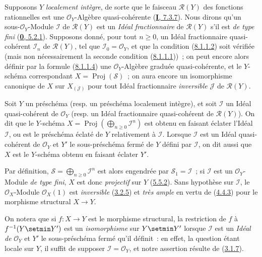 \begin{env}[8.1.2]
\label{II.8.1.2-fr}
Supposons $Y$ \emph{localement intègre}, de sorte que le faisceau
$\mathcal{R}(Y)$ des fonctions rationnelles est une $\mathcal{O}_Y$-Algèbre
quasi-cohérente (\hyperref[I.7.3.7-fr]{\textbf{I}, 7.3.7}). Nous dirons qu'un
sous-$\mathcal{O}_Y$-Module $\mathcal{I}$ de $\mathcal{R}(Y)$ est un
\emph{Idéal fractionnaire} de $\mathcal{R}(Y)$ s'il est \emph{de type fini}
(\hyperref[0.5.2.1-fr]{\textbf{0}, 5.2.1}). Supposons donné, pour tout $n\geq0$, un
Idéal fractionnaire quasi-cohérent $\mathcal{I}_n$ de $\mathcal{R}(Y)$, tel
que $\mathcal{I}_0=\mathcal{O}_Y$, et que la condition
(\hyperref[II.8.1.1.2-fr]{8.1.1.2}) soit vérifiée (mais non nécessairement la
seconde condition (\hyperref[II.8.1.1.1-fr]{8.1.1.1}))~; on peut encore alors
définir par la formule (\hyperref[II.8.1.1.4-fr]{8.1.1.4}) une
$\mathcal{O}_Y$-Algèbre graduée quasi-cohérente, et le $Y$-schéma correspondant
$X=\operatorname{Proj}(\mathcal{S})$~; on aura encore un isomorphisme
canonique de $X$ sur $X_{(\mathcal{J})}$ pour tout Idéal fractionnaire
\emph{inversible} $\mathcal{J}$ de $\mathcal{R}(Y)$.
\end{env}

\begin{definition}[8.1.3]
\label{II.8.1.3-fr}
Soit $Y$ un préschéma \textup{(resp.} un préschéma localement intègre), et soit
$\mathcal{I}$ un Idéal quasi-cohérent de $\mathcal{O}_Y$ \textup{(resp.} un Idéal
fractionnaire quasi-cohérent de $\mathcal{R}(Y)$). On dit que le $Y$-schéma
$X=\operatorname{Proj}(\bigoplus_{n\geq0}\mathcal{I}^n)$ est obtenu en
faisant éclater l'Idéal $\mathcal{I}$, ou est le préschéma éclaté
de $Y$ relativement à $\mathcal{I}$. Lorsque $\mathcal{I}$ est un Idéal
quasi-cohérent de $\mathcal{O}_Y$ et $Y'$ le sous-préschéma fermé de $Y$ défini
par $\mathcal{I}$, on dit aussi que $X$ est le $Y$-schéma obtenu en faisant
éclater $Y'$.
\end{definition}

Par définition, $\mathcal{S}=\bigoplus_{n\geq0}\mathcal{I}^n$ est alors
engendrée par $\mathcal{S}_1=\mathcal{I}$~; si $\mathcal{I}$ est un
$\mathcal{O}_Y$-Module \emph{de type fini}, $X$ est donc \emph{projectif} sur
$Y$ (\hyperref[II.5.5.2-fr]{5.5.2}). Sans hypothèse sur $\mathcal{I}$, le
$\mathcal{O}_X$-Module $\mathcal{O}_X(1)$ est \emph{inversible}
(\hyperref[II.3.2.5-fr]{3.2.5}) et \emph{très ample} en vertu de
(\hyperref[II.4.4.3-fr]{4.4.3}) pour le morphisme structural $X\to Y$.

On notera que si $f:X\to Y$ est le morphisme structural, la restriction de
$f$ à $f^{-1}(Y\setmin Y')$ est un \emph{isomorphisme} sur $Y\setmin Y'$ lorsque
$\mathcal{I}$ est un \emph{Idéal de} $\mathcal{O}_Y$ et $Y'$ le sous-préschéma fermé
qu'il définit~: en effet, la question étant locale sur $Y$, il suffit de
supposer $\mathcal{I}=\mathcal{O}_Y$, et notre assertion résulte de
(\hyperref[II.3.1.7-fr]{3.1.7}).

